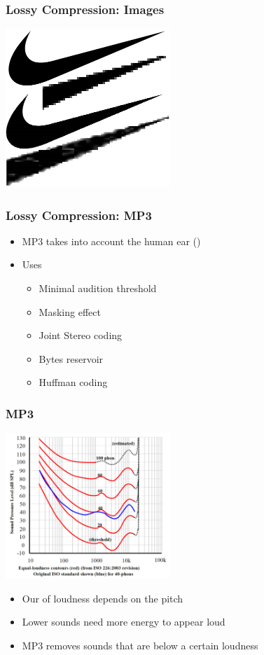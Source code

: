\documentclass{../ucll-slides}
\begin{document}
\begin{frame}
  \frametitle{Lossy Compression: Images}
  \begin{center}
    \includegraphics[height=6cm]{lossy-comparison.png}
  \end{center}
\end{frame}

\begin{frame}
  \frametitle{Lossy Compression: MP3}  
  \begin{itemize}
    \item MP3 takes into account the human ear ()
    \item Uses 
          \begin{itemize}
            \item Minimal audition threshold
            \item Masking effect
            \item Joint Stereo coding
            \item Bytes reservoir
            \item Huffman coding
          \end{itemize}
  \end{itemize}
\end{frame}

\begin{frame}
  \frametitle{MP3}
  \begin{center}
    \includegraphics[height=5.5cm]{isophones.png}
  \end{center}
  \begin{itemize}
    \item Our  of loudness depends on the pitch
    \item Lower sounds need more energy to appear loud
    \item MP3 removes sounds that are below a certain loudness
  \end{itemize}
\end{frame}
\end{document}
